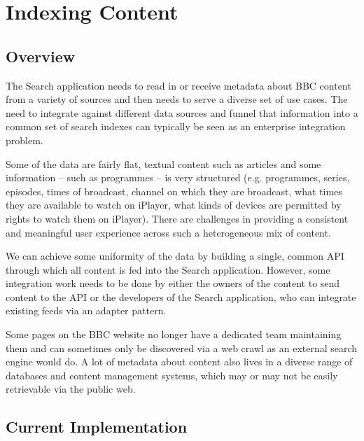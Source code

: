 \section{Indexing Content}

\subsection{Overview}

The Search application needs to read in or receive metadata about
BBC content from a variety of sources and then needs to serve
a diverse set of use cases.\cite{fenning2014applicability} The
need to integrate against different data sources and funnel
that information into a common set of search indexes can
typically be seen as an enterprise integration
problem.

Some of the data are fairly flat, textual content such as articles and some
information -- such as programmes -- is very structured (e.g. programmes,
series, episodes, times of broadcast, channel on which they are broadcast,
what times they are available to watch on iPlayer, what kinds of devices
are permitted by rights to watch them on iPlayer). There are challenges
in providing a consistent and meaningful user experience across such
a heterogeneous mix of content.

We can achieve some uniformity of the data by building a single, common
API through which all content is fed into the Search application. However,
some integration work needs to be
done by either the owners of the content to send content to the API
or the developers of the Search application, who can integrate
existing feeds via an adapter pattern.

Some pages on the BBC website no
longer have a dedicated team maintaining them and can sometimes only
be discovered via a web crawl as an external search engine would do. A lot
of metadata about content also lives in a diverse range of databases and
content management systems, which may or may not be easily retrievable
via the public web.

\subsection{Current Implementation}

